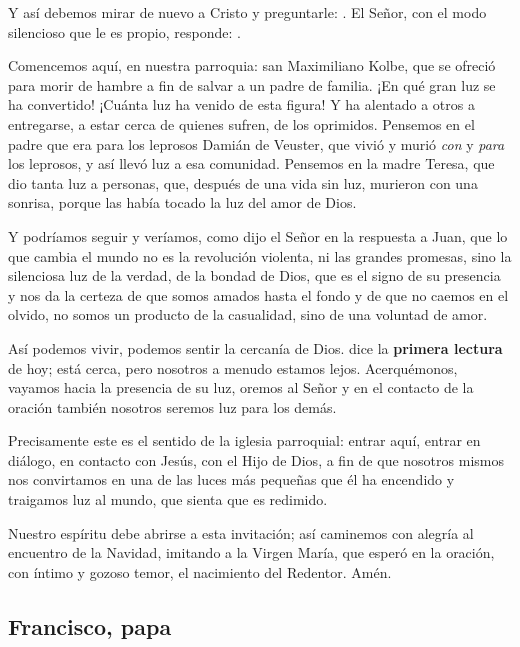 Y así debemos mirar de nuevo a Cristo y preguntarle: . El Señor, con el modo silencioso que le es propio, responde: .

Comencemos aquí, en nuestra parroquia: san Maximiliano Kolbe, que se ofreció para morir de hambre a fin de salvar a un padre de familia. ¡En qué gran luz se ha convertido! ¡Cuánta luz ha venido de esta figura! Y ha alentado a otros a entregarse, a estar cerca de quienes sufren, de los oprimidos. Pensemos en el padre que era para los leprosos Damián de Veuster, que vivió y murió \emph{con} y \emph{para} los leprosos, y así llevó luz a esa comunidad. Pensemos en la madre Teresa, que dio tanta luz a personas, que, después de una vida sin luz, murieron con una sonrisa, porque las había tocado la luz del amor de Dios.

Y podríamos seguir y veríamos, como dijo el Señor en la respuesta a Juan, que lo que cambia el mundo no es la revolución violenta, ni las grandes promesas, sino la silenciosa luz de la verdad, de la bondad de Dios, que es el signo de su presencia y nos da la certeza de que somos amados hasta el fondo y de que no caemos en el olvido, no somos un producto de la casualidad, sino de una voluntad de amor.

Así podemos vivir, podemos sentir la cercanía de Dios.  dice la \textbf{primera lectura} de hoy; está cerca, pero nosotros a menudo estamos lejos. Acerquémonos, vayamos hacia la presencia de su luz, oremos al Señor y en el contacto de la oración también nosotros seremos luz para los demás.

Precisamente este es el sentido de la iglesia parroquial: entrar aquí, entrar en diálogo, en contacto con Jesús, con el Hijo de Dios, a fin de que nosotros mismos nos convirtamos en una de las luces más pequeñas que él ha encendido y traigamos luz al mundo, que sienta que es redimido.

Nuestro espíritu debe abrirse a esta invitación; así caminemos con alegría al encuentro de la Navidad, imitando a la Virgen María, que esperó en la oración, con íntimo y gozoso temor, el nacimiento del Redentor. Amén.



\subsection{Francisco, papa}

